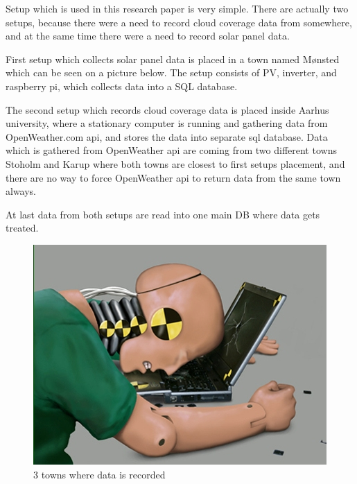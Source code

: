 Setup which is used in this research paper is very simple. There are
actually two setups, because there were a need to record cloud
coverage data from somewhere, and at the same time there were a need
to record solar panel data.

First setup which collects solar panel data is placed in a town named
Mønsted which can be seen on a picture below. The setup consists of
PV, inverter, and raspberry pi, which collects data into a SQL
database.

The second setup which records cloud coverage data is placed inside
Aarhus university, where a stationary computer is running and
gathering data from OpenWeather.com api, and stores the data into
separate sql database. Data which is gathered from OpenWeather api are
coming from two different towns Stoholm and Karup where both towns are
closest to first setups placement, and there are no way to force
OpenWeather api to return data from the same town always.

At last data from both setups are read into one main DB where data
gets treated.

\begin{figure}[h]
  \centering
 \includegraphics{dummy.jpg}
  \caption{3 towns where data is recorded}
      \label{fig:MapsPicture}
\end{figure}